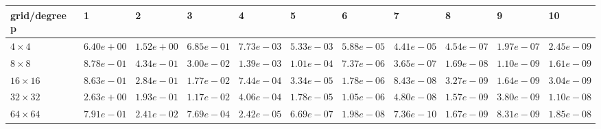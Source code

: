 \begin{tabular}{lllllllllll}
\hline
 grid/degree p   & 1          & 2          & 3          & 4          & 5          & 6          & 7          & 8          & 9          & 10         \\
\hline
 $4 \times 4$    & $6.40e+00$ & $1.52e+00$ & $6.85e-01$ & $7.73e-03$ & $5.33e-03$ & $5.88e-05$ & $4.41e-05$ & $4.54e-07$ & $1.97e-07$ & $2.45e-09$ \\
 $8 \times 8$    & $8.78e-01$ & $4.34e-01$ & $3.00e-02$ & $1.39e-03$ & $1.01e-04$ & $7.37e-06$ & $3.65e-07$ & $1.69e-08$ & $1.10e-09$ & $1.61e-09$ \\
 $16 \times 16$  & $8.63e-01$ & $2.84e-01$ & $1.77e-02$ & $7.44e-04$ & $3.34e-05$ & $1.78e-06$ & $8.43e-08$ & $3.27e-09$ & $1.64e-09$ & $3.04e-09$ \\
 $32 \times 32$  & $2.63e+00$ & $1.93e-01$ & $1.17e-02$ & $4.06e-04$ & $1.78e-05$ & $1.05e-06$ & $4.80e-08$ & $1.57e-09$ & $3.80e-09$ & $1.10e-08$ \\
 $64 \times 64$  & $7.91e-01$ & $2.41e-02$ & $7.69e-04$ & $2.42e-05$ & $6.69e-07$ & $1.98e-08$ & $7.36e-10$ & $1.67e-09$ & $8.31e-09$ & $1.85e-08$ \\
\hline
\end{tabular}